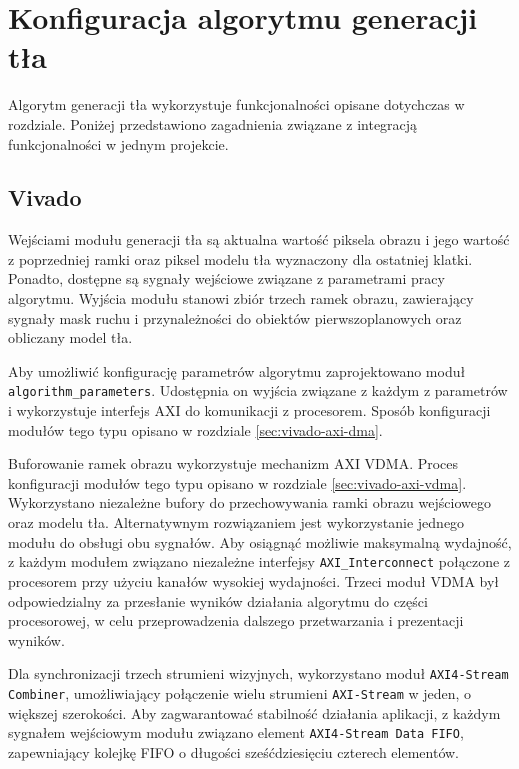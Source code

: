 
\section{Konfiguracja algorytmu generacji tła}
\label{sec:background-buffer-conf}

Algorytm generacji tła wykorzystuje funkcjonalności opisane dotychczas w rozdziale. Poniżej przedstawiono zagadnienia związane z integracją funkcjonalności w jednym projekcie.

\subsection{Vivado}

Wejściami modułu generacji tła są aktualna wartość piksela obrazu i jego wartość z poprzedniej ramki oraz piksel modelu tła wyznaczony dla ostatniej klatki. Ponadto, dostępne są sygnały wejściowe związane z parametrami pracy algorytmu. Wyjścia modułu stanowi zbiór trzech ramek obrazu, zawierający sygnały mask ruchu i przynależności do obiektów pierwszoplanowych oraz obliczany model tła.

Aby umożliwić konfigurację parametrów algorytmu zaprojektowano moduł \texttt{algorithm\_parameters}. Udostępnia on wyjścia związane z każdym z parametrów i wykorzystuje interfejs AXI do komunikacji z procesorem. Sposób konfiguracji modułów tego typu opisano w rozdziale \ref{sec:vivado-axi-dma}.

Buforowanie ramek obrazu wykorzystuje mechanizm AXI VDMA. Proces konfiguracji modułów tego typu opisano w rozdziale \ref{sec:vivado-axi-vdma}. Wykorzystano niezależne bufory do przechowywania ramki obrazu wejściowego oraz modelu tła. Alternatywnym rozwiązaniem jest wykorzystanie jednego modułu do obsługi obu sygnałów. Aby osiągnąć możliwie maksymalną wydajność, z każdym modułem związano niezależne interfejsy \texttt{AXI\_Interconnect} połączone z procesorem przy użyciu kanałów wysokiej wydajności.
Trzeci moduł VDMA był odpowiedzialny za przesłanie wyników działania algorytmu do części procesorowej, w celu przeprowadzenia dalszego przetwarzania i prezentacji wyników.

Dla  synchronizacji trzech strumieni wizyjnych, wykorzystano moduł \texttt{AXI4-Stream Combiner}, umożliwiający połączenie wielu strumieni \texttt{AXI-Stream} w jeden, o większej szerokości. Aby zagwarantować stabilność działania aplikacji, z każdym sygnałem wejściowym modułu związano element \texttt{AXI4-Stream Data FIFO}, zapewniający kolejkę FIFO o długości sześćdziesięciu czterech elementów.

